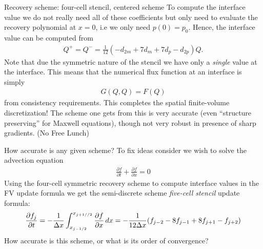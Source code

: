 \documentclass[aspectratio=169]{beamer}
\newcommand{\mypause}{\pause}
\newcommand{\pfrac}[2]{\frac{\partial #1}{\partial #2}}
\begin{document}
\begin{frame}{Recovery scheme: four-cell stencil, centered scheme}
  \small%
  To compute the interface value we do not really need all of these
  coefficients but only need to evaluate the recovery polynomial at
  $x=0$, i.e we only need $p(0) = p_0$. Hence, the interface value can
  be computed from
  \begin{align*}
    Q^+ = Q^- = \frac{1}{12}(-d_{2m} + 7 d_m + 7 d_p - d_{2p}) Q.
  \end{align*}
  Note that due the symmetric nature of the stencil we have only a
  \emph{single} value at the interface. This means that the numerical
  flux function at an interface is simply
  \begin{align*}
    G(Q,Q) = F(Q)
  \end{align*}
  from consistency requirements.%
  \mypause%
  This completes the spatial finite-volume discretization! The scheme
  one gets from this is very accurate (even ``structure preserving''
  for Maxwell equations), though not very robust in presence of sharp
  gradients. (No Free Lunch)
\end{frame}

\begin{frame}{How accurate is any given scheme?}
  To fix ideas consider we wish to solve the advection equation
  \begin{align*}
    \pfrac{f}{t} + \pfrac{f}{x} = 0
  \end{align*}
  Using the four-cell symmetric recovery scheme to compute interface
  values in the FV update formula we get the semi-discrete scheme
  \emph{five-cell stencil} update formula:
  \begin{align*}
    \pfrac{f_j}{t}
    = -\frac{1}{\Delta x}\int_{x_{j-1/2}}^{x_{j+1//2}}
    \pfrac{f}{x} \thinspace dx
    =
    -\frac{1}{12 \Delta x} (f_{j-2} - 8f_{j-1} + 8 f_{j+1} - f_{j+2})
  \end{align*}
  How accurate is this scheme, or what is its order of convergence?
\end{frame}
\end{document}
